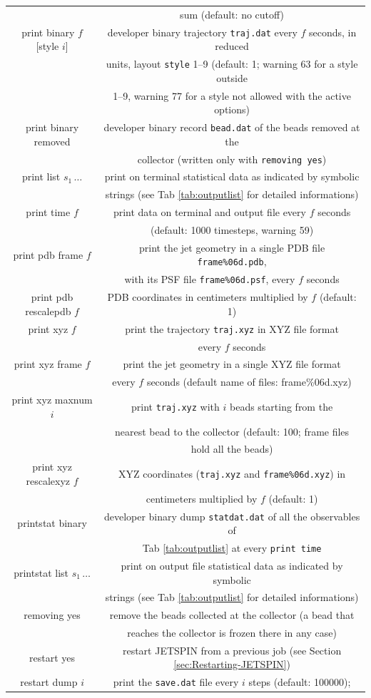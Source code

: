\begin{longtable}{cc}
 & sum (default: no cutoff)\tabularnewline
print binary $f$ [style $i$]  & developer binary trajectory \texttt{traj.dat} every $f$ seconds, in reduced\tabularnewline
 & \quad{}units, layout \texttt{style} 1--9 (default: 1; warning 63 for a style outside\tabularnewline
 & \quad{}1--9, warning 77 for a style not allowed with the active options)\tabularnewline
print binary removed  & developer binary record \texttt{bead.dat} of the beads removed at the\tabularnewline
 & \quad{}collector (written only with \texttt{removing yes})\tabularnewline
print list $s_{1}\,\ldots$  & print on terminal statistical data as indicated by symbolic\tabularnewline
 & \quad{}strings (see Tab \ref{tab:outputlist} for detailed informations)\tabularnewline
print time $f$  & print data on terminal and output file every $f$ seconds\tabularnewline
 & (default: 1000 timesteps, warning 59)\tabularnewline
print pdb frame $f$  & print the jet geometry in a single PDB file \texttt{frame\%06d.pdb},\tabularnewline
 & \quad{}with its PSF file \texttt{frame\%06d.psf}, every $f$ seconds\tabularnewline
print pdb rescalepdb $f$  & PDB coordinates in centimeters multiplied by $f$ (default: 1)\tabularnewline
print xyz $f$  & print the trajectory \texttt{traj.xyz} in XYZ file format\tabularnewline
 & \quad{}every $f$ seconds \tabularnewline
print xyz frame $f$  & print the jet geometry in a single XYZ file format\tabularnewline
 & \quad{}every $f$ seconds (default name of files: frame\%06d.xyz)\tabularnewline
print xyz maxnum $i$  & print \texttt{traj.xyz} with $i$ beads starting from the\tabularnewline
 & \quad{}nearest bead to the collector (default: 100; frame files\tabularnewline
 & \quad{}hold all the beads)\tabularnewline
print xyz rescalexyz $f$  & XYZ coordinates (\texttt{traj.xyz} and \texttt{frame\%06d.xyz}) in\tabularnewline
 & \quad{}centimeters multiplied by $f$ (default: 1)\tabularnewline
printstat binary  & developer binary dump \texttt{statdat.dat} of all the observables of\tabularnewline
 & \quad{}Tab \ref{tab:outputlist} at every \texttt{print time}\tabularnewline
printstat list $s_{1}\,\ldots$  & print on output file statistical data as indicated by symbolic\tabularnewline
 & \quad{}strings (see Tab \ref{tab:outputlist} for detailed informations)\tabularnewline
removing yes  & remove the beads collected at the collector (a bead that\tabularnewline
 & \quad{}reaches the collector is frozen there in any case)\tabularnewline
restart yes  & restart JETSPIN from a previous job (see Section \ref{sec:Restarting-JETSPIN})\tabularnewline
restart dump $i$  & print the \texttt{save.dat} file every $i$ steps (default: 100000);\tabularnewline

\end{longtable}
